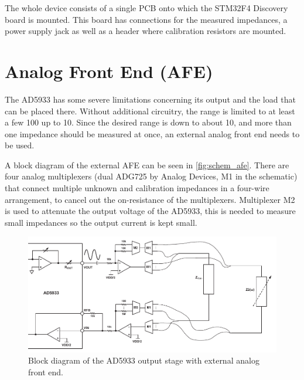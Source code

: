 The whole device consists of a single PCB onto which the STM32F4 Discovery board is mounted. This board has connections
for the measured impedances, a power supply jack as well as a header where calibration resistors are mounted.


\section{Analog Front End (AFE)}

The AD5933 has some severe limitations concerning its output and the load that can be placed there. Without additional
circuitry, the range is limited to at least a few \unit{100}{\kilo\ohm} up to \unit{10}{\mega\ohm}.
Since the desired range is down to about \unit{10}{\ohm}, and more than one impedance should be measured at once,
an external analog front end needs to be used.

A block diagram of the external AFE can be seen in \autoref{fig:schem_afe}. There are four analog multiplexers
(dual ADG725 by Analog Devices, M1 in the schematic) that connect multiple unknown and calibration impedances in a
four-wire arrangement, to cancel out the on-resistance of the multiplexers. Multiplexer M2 is used to attenuate the
output voltage of the AD5933, this is needed to measure small impedances so the output current is kept small.

\begin{figure}[hpb]
  \centering
    \includegraphics[width=\textwidth]{bilder/schem_afe.pdf}
  \caption{Block diagram of the AD5933 output stage with external analog front end.}
  \label{fig:schem_afe}
\end{figure}